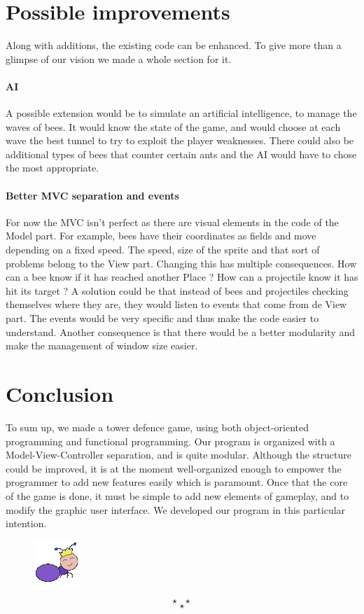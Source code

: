 \documentclass[a4paper]{article}
\newcommand{\theEnd}{\[\star ~ ~ ~ \star\]\[\star\]}
\begin{document}
\section{Possible improvements} %

Along with additions, the existing code can be enhanced. To give more than a glimpse of our vision we made a whole section for it.


\paragraph{AI} A possible extension would be to simulate an artificial intelligence, to manage the waves of bees. It would know the state of the game, and would choose at each wave the best tunnel to try to exploit the player weaknesses. There could also be additional types of bees that counter certain ants and the AI would have to chose the most appropriate.

\paragraph{Better MVC separation and events} For now the MVC isn't perfect as there are visual elements in the code of the Model part. For example, bees have their coordinates as fields and move depending on a fixed speed. The speed, size of the sprite and that sort of problems belong to the View part. Changing this has multiple consequences. How can a bee know if it has reached another Place ? How can a projectile know it has hit its target ? A solution could be that instead of bees and projectiles checking themselves where they are, they would listen to events that come from de View part. The events would be very specific and thus make the code easier to understand. Another consequence is that there would be a better modularity and make the management of window size easier.


\section*{Conclusion} %

To sum up, we made a tower defence game, using both object-oriented programming and functional programming. Our program is organized with a Model-View-Controller separation, and is quite modular. Although the structure could be improved, it is at the moment well-organized enough to empower the programmer to add new features easily which is paramount. Once that the core of the game is done, it must be simple to add new elements of gameplay, and to modify the graphic user interface. We developed our program in this particular intention.

\begin{figure}[H]
	\center
	\includegraphics[scale=0.5]{ant_queen.png}
\end{figure}

\theEnd
\end{document}
